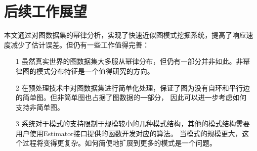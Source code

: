 \documentclass[master]{thesis-uestc}
\begin{document}
\section{后续工作展望}

    本文通过对图数据集的幂律分析，实现了快速近似图模式挖掘系统，提高了响应速度减少了估计误差。但仍有一些工作值得完善：

\begin{enumerate}
    \item[1] 虽然真实世界的图数据集大多服从幂律分布，但仍有一部分并非如此。非幂律图的模式分布特征是一个值得研究的方向。
    
    \item[2] 在预处理技术中对图数据集进行简单化处理，保证了图为没有自环和平行边的简单图。但非简单图也占据了图数据的一部分，
    因此可以进一步考虑如何支持非简单图。
    
    \item[3] 系统对于模式的支持限制于规模较小的几种模式结构，其他的模式结构需要用户使用Estimator接口提供的函数开发对应的算法。
    当模式的规模更大，这个过程将变得更复杂。如何简便地扩展到更多的模式是一个问题。

\end{enumerate}
\thesisacknowledgement







%
% 
%
% 
% 
%



\end{document}
